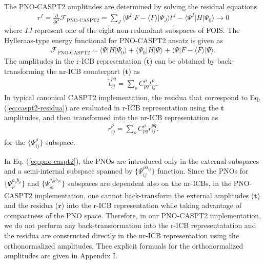 \documentclass[aip,jcp,amsmath]{revtex4-1}
\begin{document}
The PNO-CASPT2 amplitudes are determined by solving the residual equations
%
\begin{align}
  r^I=\frac{\partial}{\partial t^I}\mathscr{F}_\text{PNO-CASPT2}=\sum_J \langle\Psi^I|F-\langle F\rangle|\Psi_J\rangle t^J-\langle\Psi^I|H|\Psi_0\rangle\rightarrow 0 \label{eq:caspt2-residua}
\end{align}
%
where $IJ$ represent one of the eight non-redundant subspaces of FOIS.
%
The Hylleraas-type energy functional for PNO-CASPT2 ansatz is given as
%
\begin{align}
  \mathscr{F}_\text{PNO-CASPT2}=\langle\Psi|H|\Psi_0\rangle+\langle\Psi_0|H|\Psi\rangle+\langle\Psi|F-\langle F\rangle|\Psi\rangle.
\end{align}
%
The amplitudes in the r-ICB representation ($\tilde{\mathbf{t}}$) can be obtained by back-transforming the nr-ICB counterpart ($\mathbf{t}$) as
%
\begin{align}
  \tilde{t}^{pq}_{ij} = \sum_{\rho} C_{pq}^\rho  t^{\rho}_{ij}.
\end{align}
%
In typical canonical CASPT2 implementation, the residua that correspond to Eq. (\ref{eq:caspt2-residua}) are evaluated in r-ICB representation using the $\tilde{\mathbf{t}}$ amplitudes, and then transformed into the nr-ICB representation as
%
\begin{align}
  r^{\rho}_{ij}=\sum_{\rho} C_{pq}^\rho \tilde{r}^{pq}_{ij}.
\end{align}
for the $\{\Psi^{\rho}_{ij}\}$ subspace.

%
In Eq. (\ref{eq:pno-caspt2}), the PNOs are introduced only in the external subspaces and a semi-internal subspace spanned by $\{\Psi_{ij}^{\rho a_{ij}}\}$ function.
%
Since the PNOs for $\{\Psi_{\rho}^{a_{\rho}b_{\rho}}\}$ and $\{\Psi_{\rho i}^{a_{\rho i}b_{\rho i}}\}$ subspaces are dependent also on the nr-ICBs, in the PNO-CASPT2 implementation, one cannot back-transform the external amplitudes ($\mathbf{t}$) and the residua ($\mathbf{r}$) into the r-ICB representation while taking advantage of compactness of the PNO space.
%
Therefore, in our PNO-CASPT2 implementation, we do not perform any back-transformation into the r-ICB representatation and the residua are constructed directly in the nr-ICB representation using the orthonormalized amplitudes.
%
Thee explicit formuals for the orthonormalized amplitudes are given in Appendix I.
\end{document}
